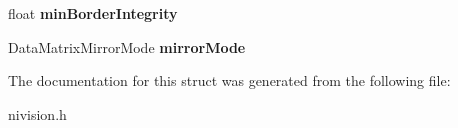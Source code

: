 \begin{DoxyCompactItemize}
\item 
\hypertarget{structDataMatrixDescriptionOptions__struct_a4f0661473641294b2054c1974f987d86}{float {\bfseries min\-Border\-Integrity}}\label{structDataMatrixDescriptionOptions__struct_a4f0661473641294b2054c1974f987d86}

\item 
\hypertarget{structDataMatrixDescriptionOptions__struct_ac76d416789e73635ff74d8fd09d3ca46}{\-Data\-Matrix\-Mirror\-Mode {\bfseries mirror\-Mode}}\label{structDataMatrixDescriptionOptions__struct_ac76d416789e73635ff74d8fd09d3ca46}

\end{DoxyCompactItemize}


\-The documentation for this struct was generated from the following file\-:\begin{DoxyCompactItemize}
\item 
nivision.\-h\end{DoxyCompactItemize}
